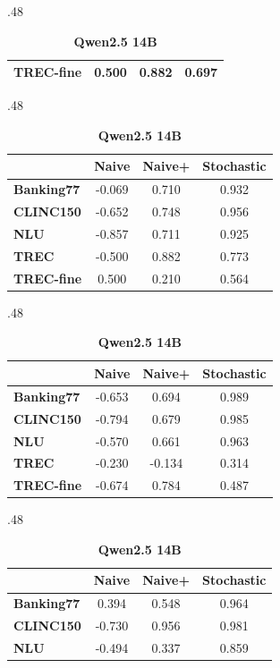 \documentclass{article}
\theoremstyle{plain}
\theoremstyle{definition}
\theoremstyle{remark}
\newcommand{\banking}{Banking77\xspace}
\newcommand{\clinic}{CLINC150\xspace}
\newcommand{\trec}{TREC\xspace}
\newcommand{\trecfine}{TREC-fine\xspace}
\newcommand{\nlu}{NLU\xspace}
\newcommand{\naiveshort}{Naive\xspace}
\newcommand{\naiveplusshort}{Naive+\xspace}
\newcommand{\expshort}{Stochastic\xspace}
\begin{document}
\begin{table}[t]
\begin{subtable}{.48\textwidth}
\begin{tabular}{l c c c}
\textbf{\trecfine} & 0.500 & 0.882 & 0.697 \\
\midrule[\heavyrulewidth]
\end{tabular}
\end{subtable}
\vspace{1em}
\begin{subtable}{.48\textwidth}
\caption{\textbf{Qwen2.5 3B}}
\centering
\begin{tabular}{l c c c}
\toprule
& \textbf{\naiveshort} & \textbf{\naiveplusshort} & \textbf{\expshort} \\
\midrule
\textbf{\banking}  & -0.069 & 0.710 & 0.932 \\
\textbf{\clinic}   & -0.652 & 0.748 & 0.956 \\
\textbf{\nlu}      & -0.857 & 0.711 & 0.925 \\
\textbf{\trec}     & -0.500 & 0.882 & 0.773 \\
\textbf{\trecfine} & 0.500 & 0.210 & 0.564 \\
\midrule[\heavyrulewidth]
\end{tabular}
\end{subtable}
\hfill
\begin{subtable}{.48\textwidth}
\caption{\textbf{Qwen2.5 7B}}
\centering
\begin{tabular}{l c c c}
\toprule
& \textbf{\naiveshort} & \textbf{\naiveplusshort} & \textbf{\expshort} \\
\midrule
\textbf{\banking}  & -0.653 & 0.694 & 0.989 \\
\textbf{\clinic}   & -0.794 & 0.679 & 0.985 \\
\textbf{\nlu}      & -0.570 & 0.661 & 0.963 \\
\textbf{\trec}     & -0.230 & -0.134 & 0.314 \\
\textbf{\trecfine} & -0.674 & 0.784 & 0.487 \\
\midrule[\heavyrulewidth]
\end{tabular}
\end{subtable}
\vspace{1em}
\begin{subtable}{.48\textwidth}
\caption{\textbf{Qwen2.5 14B}}
\centering
\begin{tabular}{l c c c}
\toprule
& \textbf{\naiveshort} & \textbf{\naiveplusshort} & \textbf{\expshort} \\
\midrule
\textbf{\banking}  & 0.394 & 0.548 & 0.964 \\
\textbf{\clinic}   & -0.730 & 0.956 & 0.981 \\
\textbf{\nlu}      & -0.494 & 0.337 & 0.859 \\

\end{tabular}
\end{subtable}
\end{table}
\end{document}
